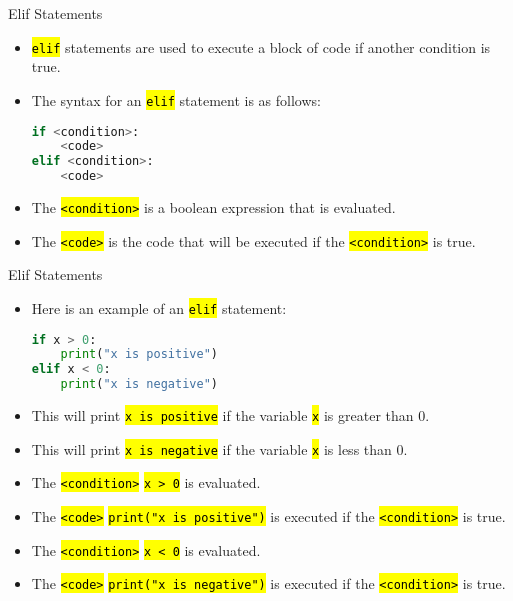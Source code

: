 \documentclass[
    aspectratio=169, 
    usepdftitle=false, 
    xcolor={dvipsnames},
    hyperref={
        colorlinks,
        linkcolor=black,
        urlcolor=blue}
    ]{beamer}
\let\OldTexttt\texttt
\renewcommand{\texttt}[1]{\OldTexttt{\hl{#1}}}%
\begin{document}
\begin{frame}[fragile]{Elif Statements}
    \begin{itemize}
        \item \texttt{elif} statements are used to execute a block of code if another condition is true.
        \item The syntax for an \texttt{elif} statement is as follows:
        \begin{lstlisting}[language=Python]
if <condition>:
    <code>
elif <condition>:
    <code>
        \end{lstlisting}
        \item The \texttt{<condition>} is a boolean expression that is evaluated.
        \item The \texttt{<code>} is the code that will be executed if the \texttt{<condition>} is true.
    \end{itemize}
\end{frame}

\begin{frame}[fragile]{Elif Statements}
    \begin{itemize}
        \item Here is an example of an \texttt{elif} statement:
        \begin{lstlisting}[language=Python]
if x > 0:
    print("x is positive")
elif x < 0:
    print("x is negative")
        \end{lstlisting}
        \item This will print \texttt{x is positive} if the variable \texttt{x} is greater than 0.
        \item This will print \texttt{x is negative} if the variable \texttt{x} is less than 0.
        \item The \texttt{<condition>} \texttt{x > 0} is evaluated.
        \item The \texttt{<code>} \texttt{print("x is positive")} is executed if the \texttt{<condition>} is true.
        \item The \texttt{<condition>} \texttt{x < 0} is evaluated.
        \item The \texttt{<code>} \texttt{print("x is negative")} is executed if the \texttt{<condition>} is true.
    \end{itemize}
\end{frame}
\end{document}
